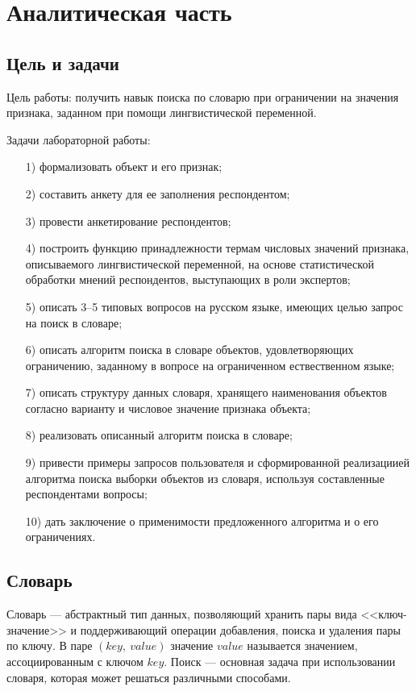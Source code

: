 \chapter{Аналитическая часть}

\section{Цель и задачи}

Цель работы: получить навык поиска по словарю при ограничении на значения признака, заданном при помощи лингвистической переменной.

Задачи лабораторной работы:
\begin{enumerate}
\item[1)] формализовать объект и его признак;
\item[2)] составить анкету для ее заполнения респондентом;
\item[3)] провести анкетирование респондентов;
\item[4)] построить функцию принадлежности термам числовых значений признака, описываемого лингвистической переменной, на основе статистической обработки мнений респондентов, выступающих в роли экспертов;
\item[5)] описать 3--5 типовых вопросов на русском языке, имеющих целью запрос на поиск в словаре;
\item[6)] описать алгоритм поиска в словаре объектов, удовлетворяющих ограничению, заданному в вопросе на ограниченном ествественном языке;
\item[7)] описать структуру данных словаря, хранящего наименования объектов согласно варианту и числовое значение признака объекта;
\item[8)] реализовать описанный алгоритм поиска в словаре;
\item[9)] привести примеры запросов пользователя и сформированной реализациией алгоритма поиска выборки объектов из словаря, используя составленные респондентами вопросы;
\item[10)] дать заключение о применимости предложенного алгоритма и о его ограничениях.
\end{enumerate}

\section{Словарь}

Словарь --- абстрактный тип данных, позволяющий хранить пары вида <<ключ-значение>> и поддерживающий операции добавления, поиска и удаления пары по ключу. 
В паре $(key,~value)$ значение $value$ называется значением, ассоциированным с ключом $key$. 
Поиск --- основная задача при использовании словаря, которая может решаться различными способами.

